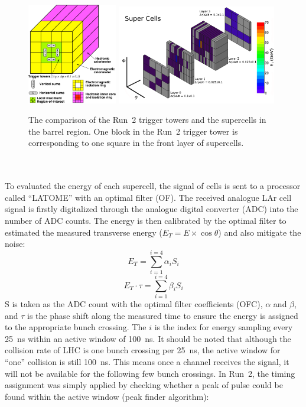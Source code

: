 \begin{figure}[!h]                
	\includegraphics[width=0.35\textwidth]{Chapter6/Run2TT.pdf}
	\includegraphics[width=0.62\textwidth]{Chapter6/Supercell.png}
	\begin{center}
		\caption{The comparison of the Run~2 trigger towers\cite{Aleksa:1602230} and the supercells\cite{Aaboud:2016leb} in the barrel region. One block in the Run~2 trigger tower is corresponding to one square in the front layer of supercells. }
		\label{Fig:tt_compar}            
	\end{center}
\end{figure}
\noindent
\\
\\To evaluated the energy of each supercell, the signal of cells is sent to a processor called ``LATOME'' with an optimal filter (OF). The received analogue LAr cell signal is firstly digitalized through the analogue digital converter (ADC) into the number of ADC counts. The energy is then calibrated by the optimal filter to estimated the measured transverse energy ($E_{T}=E\times\cos\theta$) and also mitigate the noise:
\begin{equation}
\label{Eq:get_Et}
E_{T}=\displaystyle\sum_{i=1}^{i=4}\alpha_{i}S_{i}
\end{equation}
\begin{equation}
\label{Eq:get_tau}
E_{T}\cdot\tau=\displaystyle\sum_{i=1}^{i=4}\beta_{i}S_{i}
\end{equation}
\noindent
S is taken as the ADC count with the optimal filter coefficients (OFC), $\alpha$ and $\beta$, and $\tau$ is the phase shift along the measured time to ensure the energy is assigned to the appropriate bunch crossing. The $i$ is the index for energy sampling every 25~ns within an active window of 100~ns. It should be noted that although the collision rate of LHC is one bunch crossing per 25~ns, the active window for ``one'' collision is still 100~ns. This means once a channel receives the signal, it will not be available for the following few bunch crossings. In Run~2, the timing assignment was simply applied by checking whether a peak of pulse could be found within the active window\cite{Jongmanns:2661780} (peak finder algorithm):
